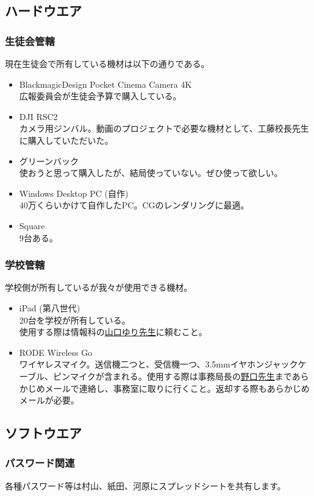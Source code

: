 \documentclass[dvipdfmx,jb5]{jarticle}
\newcommand{\mail}[2]{\href{mailto:#2}{#1}}
\begin{document}
\subsection{ハードウエア}
\subsubsection{生徒会管轄}
 現在生徒会で所有している機材は以下の通りである。
 \begin{itemize}
  \item BlackmagicDesign Pocket Cinema Camera 4K\\
  広報委員会が生徒会予算で購入している。
  \item DJI RSC2\\
  カメラ用ジンバル。動画のプロジェクトで必要な機材として、工藤校長先生に購入していただいた。
  \item グリーンバック\\
  使おうと思って購入したが、結局使っていない。ぜひ使って欲しい。
  \item Windows Desktop PC (自作)\\
 40万くらいかけて自作したPC。CGのレンダリングに最適。
  \item Square\\
  9台ある。
 \end{itemize}

 \subsubsection{学校管轄}
 学校側が所有しているが我々が使用できる機材。
 \begin{itemize}
  \item iPad (第八世代)\\
  20台を学校が所有している。\\
  使用する際は情報科の\mail{山口ゆり先生}{yuri.yamaguchi@seiko.ac.jp}に頼むこと。
  \item RODE Wireless Go\\
  ワイヤレスマイク。送信機二つと、受信機一つ、3.5mmイヤホンジャックケーブル、ピンマイクが含まれる。使用する際は事務局長の\mail{野口先生}{noguchi@seiko.ac.jp}まであらかじめメールで連絡し、事務室に取りに行くこと。返却する際もあらかじめメールが必要。
 \end{itemize}

 \subsection{ソフトウエア}
 \subsubsection{パスワード関連}
 各種パスワード等は村山、紙田、河原にスプレッドシートを共有します。
\end{document}
